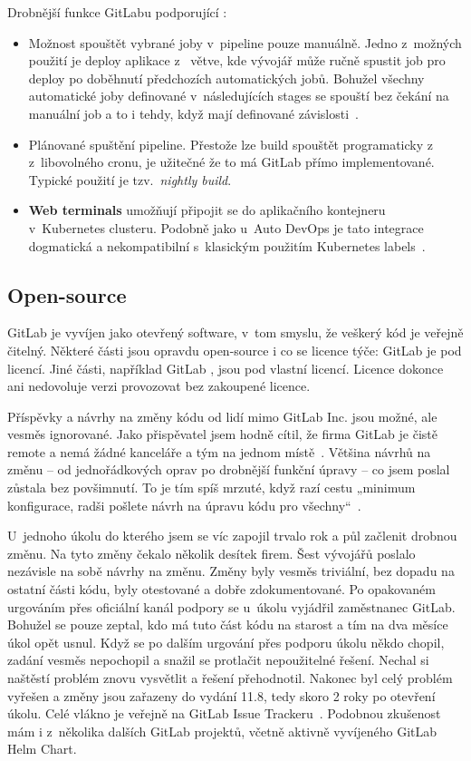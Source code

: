         Drobnější funkce GitLabu podporující \CD:
        \begin{itemize}
            \item Možnost spouštět vybrané joby v~pipeline pouze manuálně. Jedno z~možných použití je deploy aplikace z~ větve, kde vývojář může ručně spustit job pro deploy po doběhnutí předchozích automatických jobů. Bohužel všechny automatické joby definované v~následujících stages se spouští bez čekání na manuální job a to i tehdy, když mají definované závislosti~\cite{gitlab-issue-manual-job}.
            \item Plánované spuštění pipeline. Přestože lze build spouštět programaticky z~ z~libovolného cronu, je užitečné že to má GitLab přímo implementované. Typické použití je tzv.~\textit{nightly build}.
            \item \textbf{Web terminals} umožňují připojit se do aplikačního kontejneru v~Kubernetes clusteru. Podobně jako u~Auto DevOps je tato integrace dogmatická a nekompatibilní s~klasickým použitím Kubernetes labels~\cite{gitlab-issue-k8s-deploy}.
        \end{itemize}

    \subsection{Open-source}
        GitLab je vyvíjen jako otevřený software, v~tom smyslu, že veškerý kód je veřejně čitelný. Některé části jsou opravdu open-source i co se licence týče: GitLab  je pod  licencí. Jiné části, například GitLab , jsou pod vlastní licencí. Licence dokonce ani nedovoluje  verzi provozovat bez zakoupené licence.

        Příspěvky a návrhy na změny kódu od lidí mimo GitLab Inc. jsou možné, ale vesměs ignorované. Jako přispěvatel jsem hodně cítil, že firma GitLab je čistě remote a nemá žádné kanceláře a tým na jednom místě~\cite{gitlab-team}. Většina návrhů na změnu -- od jednořádkových oprav po drobnější funkční úpravy -- co jsem poslal zůstala bez povšimnutí. To je tím spíš mrzuté, když razí cestu „minimum konfigurace, radši pošlete návrh na úpravu kódu pro všechny“~\cite{gitlab-no-custom}.

        U~jednoho úkolu do kterého jsem se víc zapojil trvalo rok a půl začlenit drobnou změnu. Na tyto změny čekalo několik desítek firem. Šest vývojářů poslalo nezávisle na sobě návrhy na změnu. Změny byly vesměs triviální, bez dopadu na ostatní části kódu, byly otestované a dobře zdokumentované. Po opakovaném urgováním přes oficiální kanál podpory se u~úkolu vyjádřil zaměstnanec GitLab. Bohužel se pouze zeptal, kdo má tuto část kódu na starost a tím na dva měsíce úkol opět usnul. Když se po dalším urgování přes podporu úkolu někdo chopil, zadání vesměs nepochopil a snažil se protlačit nepoužitelné řešení. Nechal si naštěstí problém znovu vysvětlit a řešení přehodnotil. Nakonec byl celý problém vyřešen a změny jsou zařazeny do vydání 11.8, tedy skoro 2 roky po otevření úkolu. Celé vlákno je veřejně na GitLab Issue Trackeru~\cite{gitlab-issue-slow}. Podobnou zkušenost mám i z~několika dalších GitLab projektů, včetně aktivně vyvíjeného GitLab Helm Chart.

